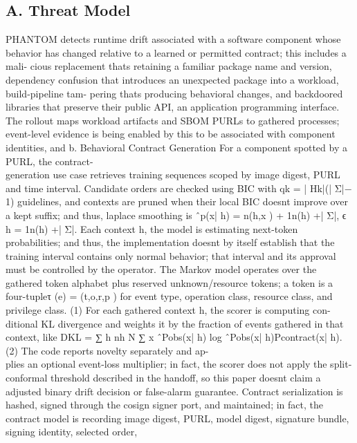 \documentclass[conference]{IEEEtran}
\begin{document}
\subsection*{A. Threat Model}
PHANTOM detects runtime drift associated with a software component whose behavior has changed relative to a learned or permitted contract; this includes a mali- cious replacement that\textquotesingle s retaining a familiar package name and version, dependency confusion that introduces an unexpected package into a workload, build-pipeline tam- pering that\textquotesingle s producing behavioral changes, and backdoored libraries that preserve their public API, an application programming interface. The rollout maps workload artifacts and SBOM PURLs to gathered processes; event-level evidence is being enabled by this to be associated with component identities, and b. Behavioral Contract Generation For a component spotted by a PURL, the contract-\\generation use case retrieves training sequences scoped by image digest, PURL and time interval. Candidate orders are checked using BIC with qk = | Hk|(| Σ|− 1) guidelines, and contexts are pruned when their local BIC doesn\textquotesingle t improve over a kept suﬀix; and thus, laplace smoothing is ˆp(x| h) = n(h,x ) + 1n(h) +| Σ|, ϵ h = 1n(h) +| Σ|. Each context h, the model is estimating next-token probabilities; and thus, the implementation doesn\textquotesingle t by itself establish that the training interval contains only normal behavior; that interval and its approval must be controlled by the operator. The Markov model operates over the gathered token alphabet plus reserved unknown/resource tokens; a token is a four-tupleτ (e) = (t,o,r,p ) for event type, operation class, resource class, and privilege class. (1) For each gathered context h, the scorer is computing con-\\ditional KL divergence and weights it by the fraction of events gathered in that context, like DKL = ∑ h nh N ∑ x ˆPobs(x| h) log ˆPobs(x| h)Pcontract(x| h). (2) The code reports novelty separately and ap-\\plies an optional event-loss multiplier; in fact, the scorer does not apply the split-conformal threshold described in the handoff, so this paper doesn\textquotesingle t claim a adjusted binary drift decision or false-alarm guarantee. Contract serialization is hashed, signed through the cosign signer port, and maintained; in fact, the contract model is recording image digest, PURL, model digest, signature bundle, signing identity, selected order,
\end{document}
